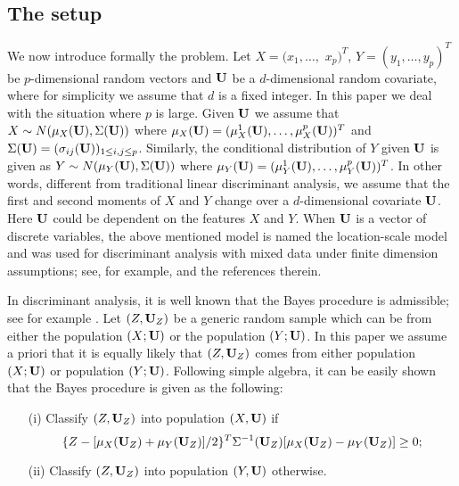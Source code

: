 \documentclass[11pt]{article}
\theoremstyle{definition}
\begin{document}
 \subsection{The setup}
 We now introduce formally the problem.
 Let $X=(x_1,\ldots,$ $x_p)^T$, $Y=(y_1,\ldots,y_p)^T$ be $p$-dimensional
 random vectors and ${\bf U}$ be a $d$-dimensional random covariate, where for simplicity we assume that $d$ is a fixed integer. In this paper we deal with the situation where $p$ is large.
 Given ${\bf U}$ we
 assume that $X\sim N(\mu_X({\bf U}), \Sigma({\bf U}))$ where $\mu_X({\bf U}) =
 (\mu_{X}^1({\bf U}),\ldots,\mu_{X}^p({\bf U}))^T$ and $\Sigma({\bf {\bf U}})=(\sigma_{ij}({\bf U}))_{1\leq
 	i,j \leq p}$. Similarly, the conditional distribution of $Y$ given ${\bf U}$ is
 given as $Y\sim N(\mu_Y({\bf U}), \Sigma({\bf U}))$ where $\mu_Y({\bf U}) =
 (\mu_{Y}^1({\bf U}),\ldots,\mu_{Y}^p({\bf U}))^T$. In other words, different from
 traditional linear discriminant analysis, we assume that the first and second moments of $X$ and $Y$ change over a $d$-dimensional covariate ${\bf U}$.
 Here ${\bf U}$ could be dependent on the features $X$ and $Y$.
 When ${\bf U}$ is a vector of discrete variables, the above mentioned model is named the location-scale model and was used for discriminant analysis with mixed data under finite dimension assumptions; see, for example, \cite{Krz1993} and the references therein.
 
 In discriminant analysis, it is well known that the Bayes procedure is
 admissible; see for example \cite{Anderson}. Let $(Z, {\bf U}_Z)$ be a generic random sample which can be
 from either the population $(X; {\bf U})$ or the population $(Y; {\bf U})$. In this paper
 we assume a priori that it is equally likely that  $(Z, {\bf U}_Z)$ comes from
 either population $(X; {\bf U})$  or population $(Y; {\bf U})$. Following simple algebra, it can be easily shown
 that the Bayes procedure is given as the following:
 
 \begin{itemize}
 	\item[(i)] Classify $(Z, {\bf U}_Z)$ into population $(X, {\bf U})$ if
 	\[\{Z-[\mu_X({\bf U}_Z)+\mu_Y({\bf U}_Z)]/2\}^T\Sigma^{-1}({\bf U}_Z)[\mu_X({\bf U}_Z)-\mu_Y({\bf U}_Z)]\geq 0;\]
 	\item[(ii)] Classify $(Z, {\bf U}_Z)$ into population $(Y, {\bf U})$ otherwise.
 \end{itemize}
 
\end{document}
